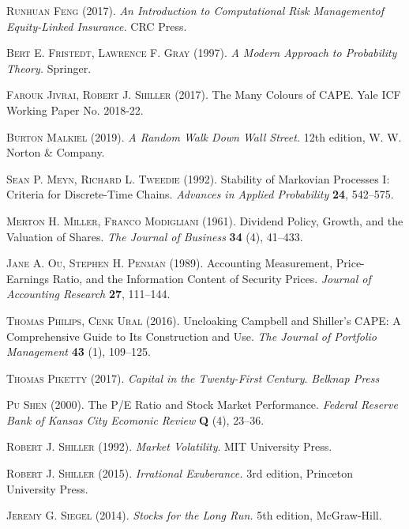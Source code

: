 \documentclass[12pt]{amsart}
\theoremstyle{definition}
\begin{document}
\begin{thebibliography}{99}
 \textsc{Runhuan Feng} (2017). \textit{An Introduction to Computational Risk Managementof Equity-Linked Insurance.} CRC Press.

 \textsc{Bert E. Fristedt, Lawrence F. Gray} (1997). \textit{A Modern Approach to Probability Theory.} Springer.

 \textsc{Farouk Jivrai, Robert J. Shiller} (2017). The Many Colours of CAPE. Yale ICF Working Paper No. 2018-22.

 \textsc{Burton Malkiel} (2019). \textit{A Random Walk Down Wall Street.} 12th edition, W. W. Norton \& Company.

 \textsc{Sean P. Meyn, Richard L. Tweedie} (1992). Stability of Markovian Processes I: Criteria for Discrete-Time Chains. \textit{Advances in Applied Probability} \textbf{24}, 542--575. 

 \textsc{Merton H. Miller, Franco Modigliani} (1961). Dividend Policy, Growth, and the Valuation of Shares. \textit{The Journal of Business} \textbf{34} (4), 41--433. 

 \textsc{Jane A. Ou, Stephen H. Penman} (1989). Accounting Measurement, Price-Earnings Ratio, and the Information Content of Security Prices. \textit{Journal of Accounting Research} \textbf{27}, 111--144.

 \textsc{Thomas Philips, Cenk Ural} (2016). Uncloaking Campbell and Shiller’s CAPE: A Comprehensive Guide to Its Construction and Use. \textit{The Journal of Portfolio Management} \textbf{43} (1), 109--125.

 \textsc{Thomas Piketty} (2017). {\it Capital in the Twenty-First Century}. {\it Belknap Press}

 \textsc{Pu Shen} (2000). The P/E Ratio and Stock Market Performance. \textit{Federal Reserve Bank of Kansas City Ecomonic Review} \textbf{Q} (4), 23--36.

 \textsc{Robert J. Shiller} (1992). \textit{Market Volatility}. MIT University Press.

 \textsc{Robert J. Shiller} (2015). \textit{Irrational Exuberance.} 3rd edition, Princeton University Press.

 \textsc{Jeremy G. Siegel} (2014). \textit{Stocks for the Long Run.} 5th edition, McGraw-Hill.

\end{thebibliography}
\end{document}
